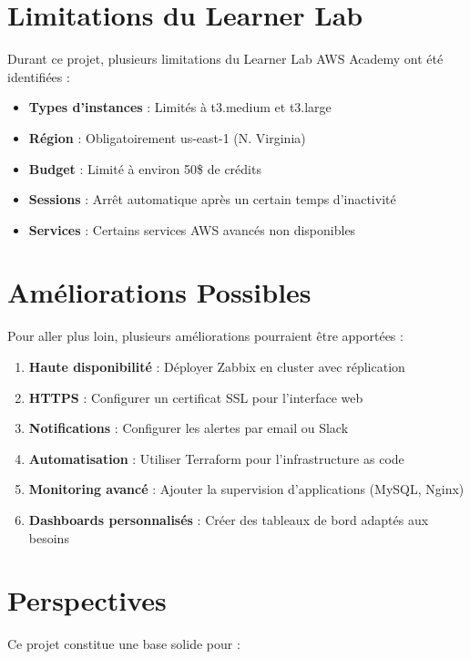 \section{Limitations du Learner Lab}

Durant ce projet, plusieurs limitations du Learner Lab AWS Academy ont été identifiées :

\begin{itemize}
    \item \textbf{Types d'instances} : Limités à t3.medium et t3.large
    \item \textbf{Région} : Obligatoirement us-east-1 (N. Virginia)
    \item \textbf{Budget} : Limité à environ 50\$ de crédits
    \item \textbf{Sessions} : Arrêt automatique après un certain temps d'inactivité
    \item \textbf{Services} : Certains services AWS avancés non disponibles
\end{itemize}

\section{Améliorations Possibles}

Pour aller plus loin, plusieurs améliorations pourraient être apportées :

\begin{enumerate}
    \item \textbf{Haute disponibilité} : Déployer Zabbix en cluster avec réplication
    \item \textbf{HTTPS} : Configurer un certificat SSL pour l'interface web
    \item \textbf{Notifications} : Configurer les alertes par email ou Slack
    \item \textbf{Automatisation} : Utiliser Terraform pour l'infrastructure as code
    \item \textbf{Monitoring avancé} : Ajouter la supervision d'applications (MySQL, Nginx)
    \item \textbf{Dashboards personnalisés} : Créer des tableaux de bord adaptés aux besoins
\end{enumerate}

\section{Perspectives}

Ce projet constitue une base solide pour :

